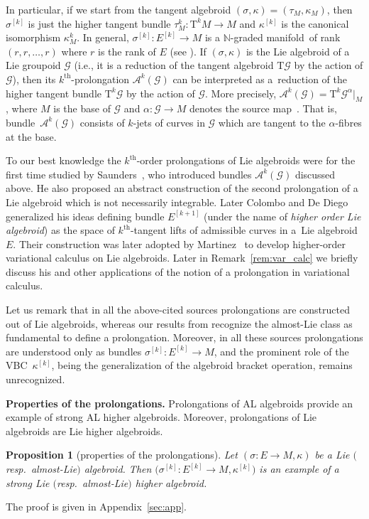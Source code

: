 \documentclass[pdftex]{sigma}
\newcommand{\grB}{{$\N$-graded manifold}}
\newcommand{\ZM}{{VBC}} %
\newcommand{\thh}[1]{#1^{\mathrm{th}}} %
\newcommand{\N}{\mathbb{N}}
\newcommand{\ra}{\rightarrow}
\newcommand{\A}{\mathcal{A}} %
\newcommand{\E}[1]{E^{[#1]}} %
\newcommand{\T}{\mathrm{T}} %
\newcommand{\TT}[1]{\mathrm{T}^{#1}} %
\newcommand{\G}{\mathcal{G}} %
\numberwithin{equation}{section}
\newtheorem{prop}[thm]{Proposition}
\theoremstyle{definition}
\begin{document}
In particular, if we start from the tangent algebroid $(\sigma,\kappa)=(\tau_M,\kappa_M)$, then $\sigma^{[k]}$ is just the higher tangent bundle $\tau^k_M\colon \TT{k}M\ra M$ and $\kappa^{[k]}$ is the canonical isomorphism $ \kappa^k_M$. In general, $\sigma^{[k]}\colon \E{k}\ra M$ is a \grB\ of rank $(r, r, \ldots, r)$ where $r$ is the rank of $E$ (see \cite[Theorem~4.5]{MJ_MR_models_high_alg_2015}). If $(\sigma, \kappa)$ is the Lie algebroid of a Lie groupoid $\mathcal{G}$ (i.e., it is a reduction of the tangent algebroid $\T\mathcal{G}$ by the action of $\mathcal{G}$), then its $\thh{k}$-prolongation $\A^k(\G)$ can be interpreted as a~reduction of the higher tangent bundle $\TT{k}\mathcal{G}$ by the action of $\G$. More precisely, $\A^k(\G) =\TT k \G^\alpha\big|_{M}$, where $M$ is the base of $\G$ and $\alpha\colon \G\ra M$ denotes the source map~\cite{MJ_MR_models_high_alg_2015}. That is, bundle~$\A^k(\G)$ consists of $k$-jets of curves in $\G$ which are tangent to the $\alpha$-fibres at the base.

To our best knowledge the $\thh{k}$-order prolongations of Lie algebroids were for the first time studied by Saunders~\cite{Saunders_2004}, who introduced bundles $\A^k(\G)$ discussed above. He also proposed an abstract construction of the second prolongation of a Lie algebroid which is not necessarily integrable. Later Colombo and De Diego~\cite{Col_deDiego_seminar_2011} generalized his ideas defining bundle $\E {k+1}$ (under the name of \emph{higher order Lie algebroid}) as the space of $\thh{k}$-tangent lifts of admissible curves in a~Lie algebroid $E$. Their construction was later adopted by Martinez~\cite{Martinez_2015} to develop higher-order variational calculus on Lie algebroids. Later in Remark~\ref{rem:var_calc} we briefly discuss his and other applications of the notion of a prolongation in variational calculus.

Let us remark that in all the above-cited sources prolongations are constructed out of Lie algebroids, whereas our results from \cite{MJ_MR_models_high_alg_2015} recognize the almost-Lie class as fundamental to define a prolongation. Moreover, in all these sources prolongations are understood only as bundles $\sigma^{[k]}\colon \E{k}\ra M$, and the prominent role of the \ZM\ $\kappa^{[k]}$, being the generalization of the algebroid bracket operation, remains unrecognized.

{\bf Properties of the prolongations.} Prolongations of AL algebroids provide an example of strong AL higher algebroids. Moreover, prolongations of Lie algebroids are Lie higher algebroids.
\begin{prop}[properties of the prolongations]\label{prop:E_k_as_AL_HA}
Let $(\sigma\colon E\ra M,\kappa)$ be a Lie $($resp.\ almost-Lie$)$ algebroid. Then $\big(\sigma^{[k]}\colon \E{k}\ra M, \kappa^{[k]}\big)$ is an example of a strong Lie $($resp.\ almost-Lie$)$ higher algebroid.
\end{prop}
The proof is given in Appendix~\ref{sec:app}.
\end{document}
